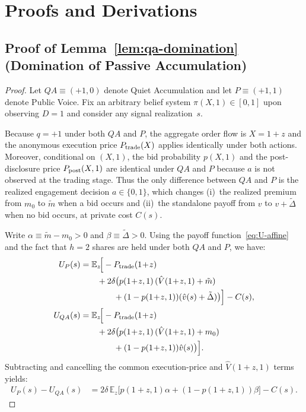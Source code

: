 \documentclass[11pt]{article}
\newcommand{\E}{\mathbb{E}}
\newcommand{\1}{\mathbf{1}}
\begin{document}
\section{Proofs and Derivations}
\label{app:proofs}

\subsection{Proof of Lemma~\ref{lem:qa-domination} (Domination of Passive Accumulation)}
\label{app:proof-qa-domination}

\begin{proof}
Let $QA\equiv(+1,0)$ denote Quiet Accumulation and let $P\equiv(+1,1)$ denote Public Voice.
Fix an arbitrary belief system $\pi(X,1)\in[0,1]$ upon observing $D=1$ and consider any signal realization~$s$.

Because $q=+1$ under both $QA$ and $P$, the aggregate order flow is $X=1+z$ and the anonymous execution price $P_{\textup{trade}}(X)$ applies identically under both actions. Moreover, conditional on $(X,1)$, the bid probability $p(X,1)$ and the post-disclosure price $P_{\textup{post}}(X,1)$ are identical under $QA$ and $P$ because $a$ is not observed at the trading stage. Thus the only difference between $QA$ and $P$ is the realized engagement decision $a\in\{0,1\}$, which changes (i)~the realized premium from $m_0$ to $\tilde m$ when a bid occurs and (ii)~the standalone payoff from $v$ to $v+\tilde\Delta$ when no bid occurs, at private cost $C(s)$.

Write $\alpha\equiv\tilde m-m_0>0$ and $\beta\equiv\tilde\Delta>0$.
Using the payoff function~\eqref{eq:U-affine} and the fact that $h=2$ shares are held under both $QA$ and $P$, we have:
\begin{align*}
U_P(s)
&=\E_z\!\Big[-P_{\textup{trade}}(1\!+\!z)\\
&\qquad +2\delta\big(p(1\!+\!z,1)\,(\hat V(1\!+\!z,1)+\tilde m)\\
&\qquad\qquad +(1-p(1\!+\!z,1))(\hat v(s)+\tilde\Delta)\big)\Big]-C(s),\\
U_{QA}(s)
&=\E_z\!\Big[-P_{\textup{trade}}(1\!+\!z)\\
&\qquad +2\delta\big(p(1\!+\!z,1)\,(\hat V(1\!+\!z,1)+m_0)\\
&\qquad\qquad +(1-p(1\!+\!z,1))\hat v(s)\big)\Big].
\end{align*}
Subtracting and cancelling the common execution-price and $\hat V(1+z,1)$ terms yields:
\begin{align*}
U_P(s)-U_{QA}(s)
&=2\delta\,\E_z\!\Big[p(1\!+\!z,1)\alpha +(1-p(1\!+\!z,1))\beta\Big]-C(s).
\end{align*}


\end{proof}
\end{document}
